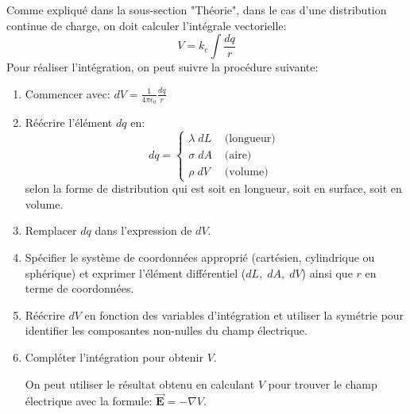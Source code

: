 \documentclass[a4paper]{article}
\begin{document}
Comme expliqué dans la sous-section "Théorie", dans le cas d'une distribution continue de charge, on doit calculer l'intégrale vectorielle: \[ V = k_e \int \frac{d q}{r} \]
Pour réaliser l'intégration, on peut suivre la procédure suivante: 
\begin{enumerate}
    \item Commencer avec: $\displaystyle d V = \frac{1}{4 \pi \epsilon_0} \frac{d q}{r} $
    \item Réécrire l'élément $ d q $ en: 
\[ d q =
\begin{cases}
\lambda \; d L      & \text{ (longueur) } \\
\sigma \; d A       & \text{ (aire) } \\
\rho \; d V         & \text{ (volume) }
\end{cases}
\]
selon la forme de distribution qui est soit en longueur, soit en surface, soit en volume.
    \item Remplacer $ d q $ dans l'expression de $ d V $.
    \item Spécifier le système de coordonnées approprié (cartésien, cylindrique ou sphérique) et exprimer l'élément différentiel ($ d L, 
\; d A, \; d V $) ainsi que $ r $ en terme de coordonnées.
    \item Réécrire $ d V $ en fonction des variables d'intégration et utiliser la symétrie pour identifier les composantes 
non-nulles du champ électrique.
    \item Compléter l'intégration pour obtenir $ V $.

On peut utiliser le résultat obtenu en calculant $ V $ pour trouver le champ électrique avec la formule: $ \vec{\textbf{E}} = - \nabla V $.
\end{enumerate}
\end{document}
